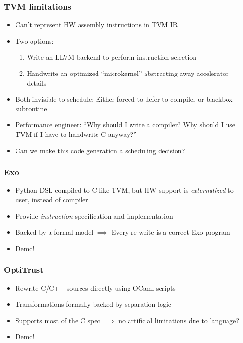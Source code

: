 \documentclass[aspectratio=169]{beamer}
\begin{document}
\begin{frame}
    \frametitle{TVM limitations}
    \begin{itemize}
    \item Can't represent HW assembly instructions in TVM IR \pause
    \item Two options:
    \begin{enumerate}
        \item Write an LLVM backend to perform instruction selection
        \item Handwrite an optimized ``microkernel'' abstracting away accelerator details
    \end{enumerate}
    \item Both invisible to schedule: Either forced to defer to compiler or blackbox subroutine \pause
    \item Performance engineer: ``Why should I write a compiler? Why should I use TVM if I have to handwrite C anyway?''\pause
    \item Can we make this code generation a scheduling decision?
    \end{itemize}
\end{frame}

\begin{frame}
    \frametitle{Exo}
    \begin{itemize}
    \item Python DSL compiled to C like TVM, but HW support is \textit{externalized} to user, instead of compiler
    \item Provide \textit{instruction} specification and implementation
    \item Backed by a formal model $\implies$ Every re-write is a correct Exo program
    \item Demo!
    \end{itemize}

\end{frame}

\begin{frame}
    \frametitle{OptiTrust}
    \begin{itemize}
    \item Rewrite C/C++ sources directly using OCaml scripts
    \item Transformations formally backed by separation logic
    \item Supports most of the C spec $\implies$ no artificial limitations due to language?
    \item Demo!
    \end{itemize}
\end{frame}
\end{document}
